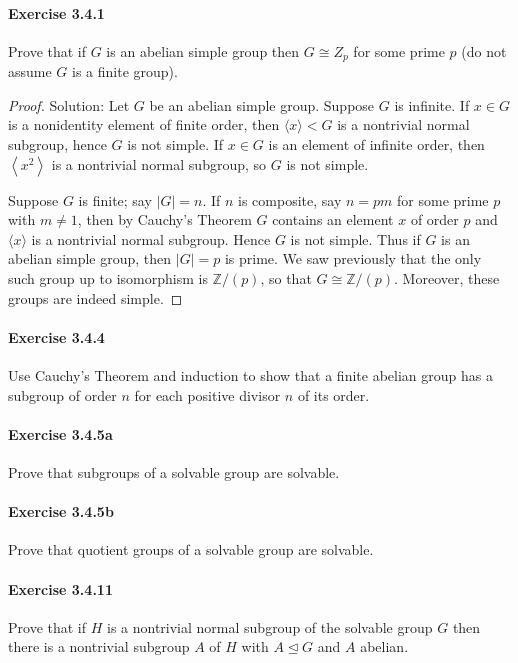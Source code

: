 \documentclass{article}
\theoremstyle{definition}
\begin{document}
\paragraph{Exercise 3.4.1} Prove that if $G$ is an abelian simple group then $G \cong Z_{p}$ for some prime $p$ (do not assume $G$ is a finite group).
\begin{proof}
    Solution: Let $G$ be an abelian simple group.
Suppose $G$ is infinite. If $x \in G$ is a nonidentity element of finite order, then $\langle x\rangle<G$ is a nontrivial normal subgroup, hence $G$ is not simple. If $x \in G$ is an element of infinite order, then $\left\langle x^2\right\rangle$ is a nontrivial normal subgroup, so $G$ is not simple.

Suppose $G$ is finite; say $|G|=n$. If $n$ is composite, say $n=p m$ for some prime $p$ with $m \neq 1$, then by Cauchy's Theorem $G$ contains an element $x$ of order $p$ and $\langle x\rangle$ is a nontrivial normal subgroup. Hence $G$ is not simple. Thus if $G$ is an abelian simple group, then $|G|=p$ is prime. We saw previously that the only such group up to isomorphism is $\mathbb{Z} /(p)$, so that $G \cong \mathbb{Z} /(p)$. Moreover, these groups are indeed simple.
\end{proof}


\paragraph{Exercise 3.4.4} Use Cauchy's Theorem and induction to show that a finite abelian group has a subgroup of order $n$ for each positive divisor $n$ of its order.

\paragraph{Exercise 3.4.5a} Prove that subgroups of a solvable group are solvable.

\paragraph{Exercise 3.4.5b} Prove that quotient groups of a solvable group are solvable.

\paragraph{Exercise 3.4.11} Prove that if $H$ is a nontrivial normal subgroup of the solvable group $G$ then there is a nontrivial subgroup $A$ of $H$ with $A \unlhd G$ and $A$ abelian.
\end{document}
